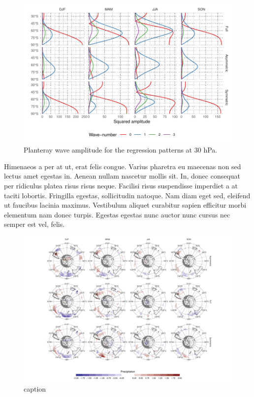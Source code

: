 \documentclass[twocol]{ametsocV5}
\begin{document}
\begin{figure}
\includegraphics{wave-amplitude-30-1} \caption[Planteray wave amplitude for the regression patterns at 30 hPa]{Planteray wave amplitude for the regression patterns at 30 hPa.}\label{fig:wave-amplitude-30}
\end{figure}

Himenaeos a per at ut, erat felis congue. Varius pharetra eu maecenas
non sed lectus amet egestas in. Aenean nullam nascetur mollis sit. In,
donec consequat per ridiculus platea risus risus neque. Facilisi risus
suspendisse imperdiet a at taciti lobortis. Fringilla egestas,
sollicitudin natoque. Nam diam eget sed, eleifend ut faucibus lacinia
maximus. Vestibulum aliquet curabitur sapien efficitur morbi elementum
nam donec turpis. Egestas egestas nunc auctor nunc cursus nec semper est
vel, felis.

\begin{figure}
\includegraphics{pp-regr-global-1} \caption[caption]{caption}\label{fig:pp-regr-global}
\end{figure}
\end{document}
